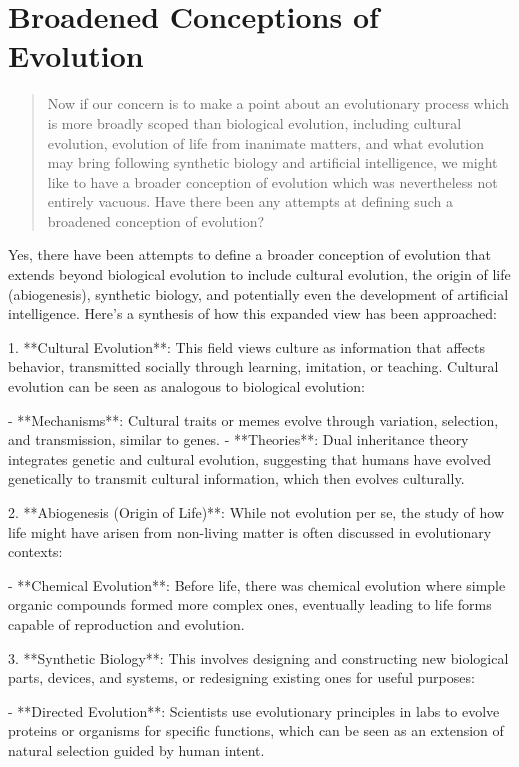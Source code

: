 \documentclass[12pt,titlepage]{book}
\begin{document}
\section{Broadened Conceptions of Evolution}

\begin{quotation}
Now if our concern is to make a point about an evolutionary process which is more broadly scoped than biological evolution, including cultural evolution, evolution of life from inanimate matters, and what evolution may bring following  synthetic biology and artificial intelligence, we might like to have a broader conception of evolution which was nevertheless not entirely vacuous.  Have there been any attempts at defining such a broadened conception of evolution?
\end{quotation}

Yes, there have been attempts to define a broader conception of evolution that extends beyond biological evolution to include cultural evolution, the origin of life (abiogenesis), synthetic biology, and potentially even the development of artificial intelligence. Here's a synthesis of how this expanded view has been approached:

1. **Cultural Evolution**: This field views culture as information that affects behavior, transmitted socially through learning, imitation, or teaching. Cultural evolution can be seen as analogous to biological evolution:

   - **Mechanisms**: Cultural traits or memes evolve through variation, selection, and transmission, similar to genes.
   - **Theories**: Dual inheritance theory integrates genetic and cultural evolution, suggesting that humans have evolved genetically to transmit cultural information, which then evolves culturally.

2. **Abiogenesis (Origin of Life)**: While not evolution per se, the study of how life might have arisen from non-living matter is often discussed in evolutionary contexts:

   - **Chemical Evolution**: Before life, there was chemical evolution where simple organic compounds formed more complex ones, eventually leading to life forms capable of reproduction and evolution.

3. **Synthetic Biology**: This involves designing and constructing new biological parts, devices, and systems, or redesigning existing ones for useful purposes:

   - **Directed Evolution**: Scientists use evolutionary principles in labs to evolve proteins or organisms for specific functions, which can be seen as an extension of natural selection guided by human intent.
\end{document}
